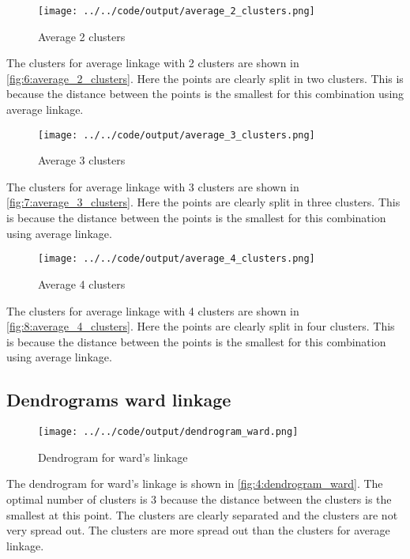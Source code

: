 \documentclass[twoside, a4paper, fleqn, reqno]{article}
\begin{document}
\begin{figure}[H]
	\centering
	\texttt{[image: ../../code/output/average\_2\_clusters.png]}
	\caption{Average 2 clusters}
	\label{fig:6:average_2_clusters}
\end{figure}

The clusters for average linkage with 2 clusters are shown in \autoref{fig:6:average_2_clusters}.
Here the points are clearly split in two clusters.
This is because the distance between the points is the smallest for this combination using average linkage.

\begin{figure}[H]
	\centering
	\texttt{[image: ../../code/output/average\_3\_clusters.png]}
	\caption{Average 3 clusters}
	\label{fig:7:average_3_clusters}
\end{figure}

The clusters for average linkage with 3 clusters are shown in \autoref{fig:7:average_3_clusters}.
Here the points are clearly split in three clusters.
This is because the distance between the points is the smallest for this combination using average linkage.

\begin{figure}[H]
	\centering
	\texttt{[image: ../../code/output/average\_4\_clusters.png]}
	\caption{Average 4 clusters}
	\label{fig:8:average_4_clusters}
\end{figure}

The clusters for average linkage with 4 clusters are shown in \autoref{fig:8:average_4_clusters}.
Here the points are clearly split in four clusters.
This is because the distance between the points is the smallest for this combination using average linkage.

\subsection{Dendrograms ward linkage}

\begin{figure}[H]
	\centering
	\texttt{[image: ../../code/output/dendrogram\_ward.png]}
	\caption{Dendrogram for ward's linkage}
	\label{fig:4:dendrogram_ward}
\end{figure}

The dendrogram for ward's linkage is shown in \autoref{fig:4:dendrogram_ward}.
The optimal number of clusters is 3 because the distance between the clusters is the smallest at this point.
The clusters are clearly separated and the clusters are not very spread out.
The clusters are more spread out than the clusters for average linkage.
\end{document}
